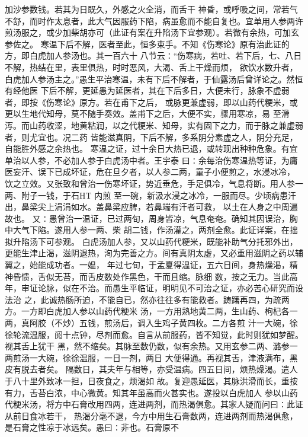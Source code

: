 \documentclass[a4paper,12pt,UTF8,twoside]{ctexbook}
\begin{document}
加沙参数钱。若其为日既久，外感之火全消，而舌干 
神昏，或呼吸之间，常若气不舒，而时作太息者，此大气因服药下陷，病虽愈而不能自复也。宜单用人参两许 
煎汤服之，或少加柴胡亦可（此证有案在升陷汤下宜参观）。若微有余热，可加玄参佐之。 
寒温下后不解，医者至此，恒多束手。不知《伤寒论》原有治此证的方，即白虎加人参汤也。其一百六十 
八节云∶“伤寒病，若吐、若下后，七、八日不解，热结在里，表里俱热，时时恶风，大渴、舌上干燥而烦， 
欲饮水数升者，白虎加人参汤主之。”愚生平治寒温，未有下后不解者，于仙露汤后曾详论之。然恒有经他医 
下后不解，更延愚为延医者，其在下后多日，大便未行，脉象不虚弱者，即按《伤寒论》原方。若在甫下之后， 
或脉更兼虚弱，即以山药代粳米，或更以生地代知母，莫不随手奏效。盖甫下之后，大便不实，骤用寒凉，易 
至滑泻。而山药收涩，地黄粘润，以之代粳米、知母，实有固下之力，而于脉之兼虚弱者，则尤宜也。况二药 
皆能滋真阴，下后不解，多系阴分素虚之人，阴分充足，自能胜外感之余热也。 
寒温之证，过十余日大热已退，或转现出种种危象。有宜单治以人参，不必加人参于白虎汤中者。王宇泰 
曰∶余每治伤寒温热等证，为庸医妄汗、误下已成坏证，危在旦夕者，以人参二两，童子小便煎之，水浸冰冷， 
饮之立效。又张致和曾治一伤寒坏证，势近垂危，手足俱冷，气息将断。用人参一两、附子一钱，于石HT 内煎 
至一碗，新汲水浸之冰冷，一服而尽。少顷病患汗出，鼻梁尖上涓涓如水。盖鼻梁应脾，若鼻端有汗者可救， 
以土在人身之中周遍故也。 
又∶愚曾治一温证，已过两旬，周身皆凉，气息奄奄。确知其因误治，胸中大气下陷。遂用人参一两、柴 
胡二钱，作汤灌之，两剂全愈。此证详案，在拙拟升陷汤下可参观。 
白虎汤加人参，又以山药代粳米，既能补助气分托邪外出， 
更能生津止渴，滋阴退热，洵为完善之方。间有真阴太虚，又必重用滋阴之药以辅翼之，始能成功者。一媪， 
年过七旬，于孟夏得温证，五六日间，身热燥渴，精神昏愦，舌似无苔，而舌皮数处作黑色，干而且缩。脉细 
数，按之无力。当此高年，审证论脉，似在不治。而愚生平临证，明明见不可治之证，亦必苦心研究而设法治 
之，此诚热肠所迫，不能自已，然亦往往多有能救者。踌躇再四，为疏两方。一方即白虎加人参以山药代粳米 
汤，一方用熟地黄二两，生山药、枸杞各一两，真阿胶（不炒）五钱，煎汤后，调入生鸡子黄四枚。二方各煎 
汁一大碗，徐徐轮流温服，阅十点钟，尽剂而愈。自言从前服药，皆不知觉，此时则犹如梦醒。视其舌上犹干 
黑，然不缩矣。其脉至数仍数，似有余热。又用玄参二两、潞参一两煎汤一大碗，徐徐温服，一日一剂，两日 
大便得通。再视其舌，津液满布，黑皮有脱去者矣。 
隔数日，其夫年与相等，亦受温病。四五日间，烦热燥渴。遣人于八十里外致冰一担，日夜食之，烦渴如 
故。复迎愚延医，其脉洪滑而长，重按有力，舌苔白浓，中心微黄。知其年虽高而火甚实也。遂投以白虎加人 
参以山药代粳米汤，将方中石膏改用四两，连进两剂，而热渴俱愈。其家人疑而问曰∶此证从前日食冰若干， 
热渴分毫不退，今方中用生石膏数两，连进两剂而热渴俱愈，是石膏之性凉于冰远矣。愚曰∶非也。石膏原不 
\end{document}
